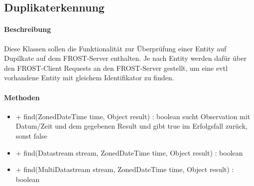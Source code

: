 \subsection{Duplikaterkennung}

\paragraph{Beschreibung}
Diese Klassen sollen die Funktionalität zur Überprüfung einer Entity auf Dupilkate auf dem FROST-Server enthalten.
Je nach Entity werden dafür über den FROST-Client Requests an den FROST-Server gestellt, um eine evtl vorhandene Entity mit gleichem Identifikator zu finden.

\paragraph{Methoden}
\begin{itemize}
\item + find(ZonedDateTime time, Object result) : boolean
sucht Observation mit Datum/Zeit und dem gegebenen Result und gibt true im Erfolgsfall zurück, sonst false
\item + find(Datastream stream, ZonedDateTime time, Object result) : boolean
\item + find(MultiDatastream stream, ZonedDateTime time, Object result) : boolean
\end{itemize}
